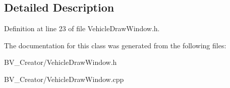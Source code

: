 \subsection{Detailed Description}


Definition at line 23 of file VehicleDrawWindow.h.

The documentation for this class was generated from the following files:\begin{DoxyCompactItemize}
\item 
BV\_\-Creator/VehicleDrawWindow.h\item 
BV\_\-Creator/VehicleDrawWindow.cpp\end{DoxyCompactItemize}
